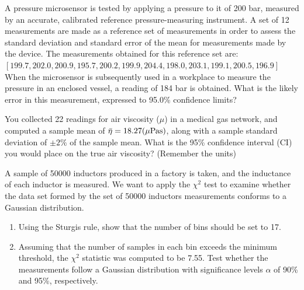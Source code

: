 \documentclass[a4paper,11pt]{book}
\begin{document}
\begin{question}
A pressure microsensor is tested by applying a pressure to it of 200 bar, measured by an accurate, calibrated reference pressure-measuring instrument. A set of 12 measurements are made as a reference set of measurements in order to assess the standard deviation and standard error of the mean for measurements made by the device. The measurements obtained for this reference set are: \\
$\left[199.7, 202.0, 200.9, 195.7, 200.2, 199.9, 204.4, 198.0, 203.1, 199.1,  200.5, 196.9\right]$ \\

When the microsensor is subsequently used in a workplace to measure the pressure in an enclosed vessel, a reading of 184 bar is obtained. What is the likely error in this measurement, expressed to
95.0\% confidence limits?

\examspace*{10em}

\end{question}
\begin{solution}


\end{solution}

\begin{question}
You collected 22 readings for air viscosity ($\mu$) in a medical gas network, and computed a sample mean
of $\rm \bar{\eta} = 18.27 ( \rm \mu Pa s)$, along with a sample standard deviation of $\pm 2\%$ of the sample mean. What is the 95\% confidence interval (CI) you would place on the true air viscosity? (Remember the units)

\examspace*{10em}

\end{question}
\begin{solution}

\end{solution}

\begin{question}
A sample of 50000 inductors produced in a factory is taken, and the inductance of each inductor is measured. We want to apply the ${\chi}^2$ test to examine whether the data set formed by the set of 50000
inductors measurements conforms to a Gaussian distribution.
\begin{enumerate}
\item Using the Sturgis rule, show that the number of bins should be set to 17.
\item Assuming that the number of samples in each bin exceeds the minimum threshold, the ${\chi}^2$  statistic was computed to be 7.55. Test whether the measurements follow a Gaussian distribution with significance levels $\alpha$ of 90\% and 95\%, respectively.
\end{enumerate}
\examspace*{10em}

\end{question}
\begin{solution}

\end{solution}
\end{document}
